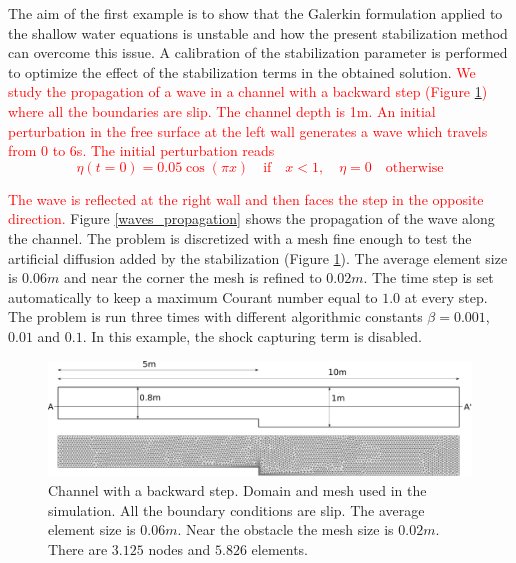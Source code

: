 \documentclass[a4paper,12pt]{elsarticle}
\newcommand{\Miguel}[1]{\textcolor{red}{#1}}
\begin{document}
The aim of the first example is to show that the Galerkin formulation applied to the shallow water equations is unstable and how the present stabilization method can overcome this issue. A calibration of the stabilization parameter is performed to optimize the effect of the stabilization terms in the obtained solution.
\Miguel{
We study the propagation of a wave in a channel with a backward step (Figure \ref{step_mesh}) where all the boundaries are slip. The channel depth is 1m. An initial perturbation in the free surface at the left wall generates a wave which travels from 0 to 6s. The initial perturbation reads
\begin{equation}
\eta(t=0) = 0.05\cos(\pi x) \quad \text{if} \quad x<1, \quad \eta=0 \quad \text{otherwise}
\end{equation}
}

\Miguel{
The wave is reflected at the right wall and then faces the step in the opposite direction.
}%
Figure \ref{waves_propagation} shows the propagation of the wave along the channel.
The problem is discretized with a mesh fine enough to test the artificial diffusion added by the stabilization (Figure \ref{step_mesh}). The average element size is $0.06m$ and near the corner the mesh is refined to $0.02m$.
The time step is set automatically to keep a maximum Courant number equal to $1.0$ at every step. The problem is run three times with different algorithmic constants $\beta = 0.001$, $0.01$ and $0.1$. In this example, the shock capturing term is disabled.

\begin{figure}
    \includegraphics[width=\textwidth]{img/step/geometry.pdf}
    \caption{Channel with a backward step. Domain and mesh used in the simulation. All the boundary conditions are slip. The average element size is $0.06m$. Near the obstacle the mesh size is $0.02m$. There are $3.125$ nodes and $5.826$ elements.}
    \label{step_mesh}
\end{figure}
\end{document}
